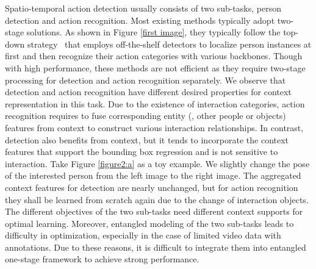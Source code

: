 \documentclass[final]{cvpr}
\begin{document}
Spatio-temporal action detection usually consists of two sub-tasks, person detection and action recognition.
Most existing methods typically adopt two-stage solutions. As shown in Figure \ref{first image}, they typically follow the top-down strategy~\cite{DBLP:conf/cvpr/GuSRVPLVTRSSM18,DBLP:conf/eccv/SunSVMSS18,DBLP:conf/cvpr/YangY0XDK19,Wu_2019_CVPR,DBLP:conf/eccv/WuKWZW20,DBLP:conf/eccv/TangXMPL20,DBLP:conf/cvpr/PanCSLS021} that employs off-the-shelf detectors to localize person instances at first and then recognize their action categories with various backbones. Though with high performance, these methods are not efficient as they require two-stage processing for detection and action recognition separately.
We observe that detection and action recognition have different desired properties for context representation in this task. Due to the existence of interaction categories, action recognition requires to fuse corresponding entity (\eg, other people or objects) features from context to construct various interaction relationships. In contrast, detection also benefits from context, but it tends to incorporate the context features that support the bounding box regression and is not sensitive to interaction. Take Figure \ref{figure2:a} as a toy example. We slightly change the pose of the interested person from the left image to the right image. The aggregated context features for detection are nearly unchanged, but for action recognition they shall be learned from scratch again due to the change of interaction objects.
The different objectives of the two sub-tasks need different context supports for optimal learning.
Moreover, entangled modeling of the two sub-tasks leads to difficulty in optimization, especially in the case of limited video data with annotations.
Due to these reasons, it is difficult to integrate them into entangled one-stage framework to achieve strong performance.
\end{document}
